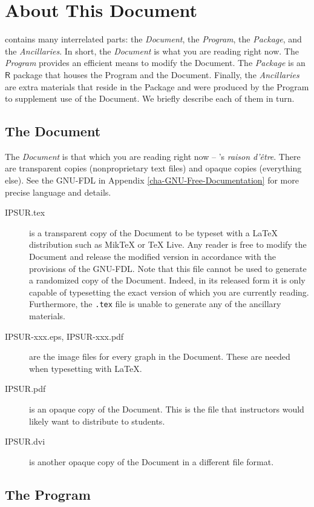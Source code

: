 \section*{About This Document}
\IPSUR contains many interrelated parts: the \emph{Document}, the \emph{Program}, the \emph{Package}, and the \emph{Ancillaries}. In short, the \emph{Document} is what you are reading right now. The \emph{Program} provides an efficient means to modify the Document. The \emph{Package} is an \(\mathsf{R}\) package that houses the Program and the Document. Finally, the \emph{Ancillaries} are extra materials that reside in the Package and were produced by the Program to supplement use of the Document. We briefly describe each of them in turn.

\subsection*{The Document}

The \emph{Document} is that which you are reading right now -- \IPSUR's \emph{raison d'\^etre}. There are transparent copies (nonproprietary text files) and opaque copies (everything else). See the GNU-FDL in Appendix \ref{cha-GNU-Free-Documentation} for more precise language and details.

\begin{description}
\item[IPSUR.tex] is a transparent copy of the Document to be typeset with a \LaTeX{} distribution such as MikTeX or \TeX{} Live. Any reader is free to modify the Document and release the modified version in accordance with the provisions of the GNU-FDL. Note that this file cannot be used to generate a randomized copy of the Document. Indeed, in its released form it is only capable of typesetting the exact version of \IPSUR which you are currently reading. Furthermore, the \texttt{.tex} file is unable to generate any of the ancillary materials.
\item[IPSUR-xxx.eps, IPSUR-xxx.pdf] are the image files for every graph in the Document. These are needed when typesetting with \LaTeX{}.
\item[IPSUR.pdf] is an opaque copy of the Document. This is the file that instructors would likely want to distribute to students.
\item[IPSUR.dvi] is another opaque copy of the Document in a different file format.
\end{description}

\subsection*{The Program}

